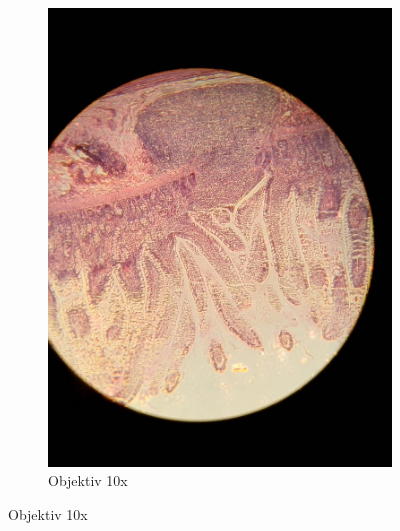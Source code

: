 \begin{figure}[h!]
\begin{subfigure}[b]{0.3\textwidth}
		\includegraphics[width=1\textwidth]{../images/03_mammal_illeum.jpg}
		\caption{Objektiv 10x}
	\end{subfigure}


\end{figure}
